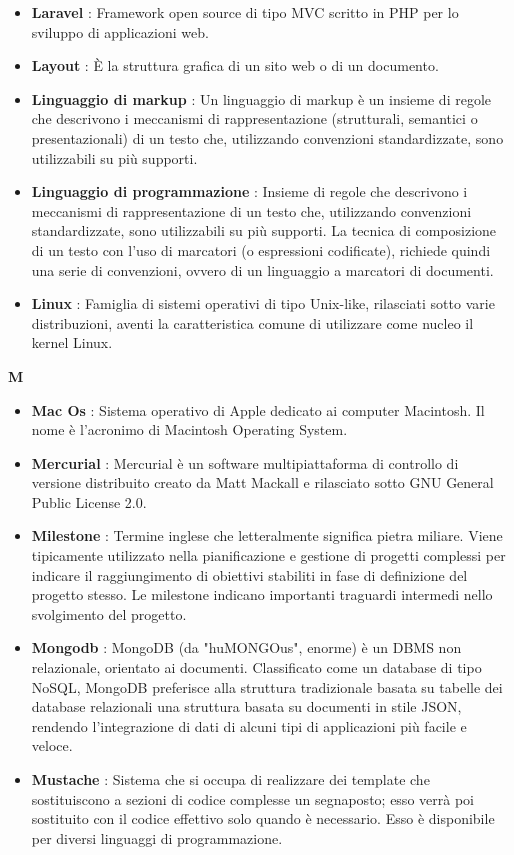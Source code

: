 \begin{flushleft}
\begin{itemize}[label={}]
\item \textbf{Laravel} : Framework open source di tipo MVC scritto in PHP per lo sviluppo di applicazioni web.
\item \textbf{Layout} : È la struttura grafica di un sito web o di un documento.
\item \textbf{Linguaggio di markup} : Un linguaggio di markup è un insieme di regole che descrivono i meccanismi di rappresentazione (strutturali, semantici o presentazionali) di un testo che, utilizzando convenzioni standardizzate, sono utilizzabili su più supporti.
\item \textbf{Linguaggio di programmazione} : Insieme di regole che descrivono i meccanismi di rappresentazione di un testo che, utilizzando convenzioni standardizzate, sono utilizzabili su più supporti. La tecnica di composizione di un testo con l'uso di marcatori (o espressioni codificate), richiede quindi una serie di convenzioni, ovvero di un linguaggio a marcatori di documenti.
\item \textbf{Linux} : Famiglia di sistemi operativi di tipo Unix-like, rilasciati sotto varie distribuzioni, aventi la caratteristica comune di utilizzare come nucleo il kernel Linux.
\end{itemize}
\end{flushleft}
\newpage
{\huge \textbf{M}}
\begin{flushleft}
\begin{itemize}[label={}]
\item \textbf{Mac Os} : Sistema operativo di Apple dedicato ai computer Macintosh. Il nome è l'acronimo di Macintosh Operating System.
\item \textbf{Mercurial} : Mercurial è un software multipiattaforma di controllo di versione distribuito creato da Matt Mackall e rilasciato sotto GNU General Public License 2.0.
\item \textbf{Milestone} : Termine inglese che letteralmente significa pietra miliare. Viene tipicamente utilizzato nella pianificazione e gestione di progetti complessi per indicare il raggiungimento di obiettivi stabiliti in fase di definizione del progetto stesso. Le milestone indicano importanti traguardi intermedi nello svolgimento del progetto.
\item \textbf{Mongodb} : MongoDB (da "huMONGOus", enorme) è un DBMS non relazionale, orientato ai documenti. Classificato come un database di tipo NoSQL, MongoDB preferisce alla struttura tradizionale basata su tabelle dei database relazionali una struttura basata su documenti in stile JSON, rendendo l'integrazione di dati di alcuni tipi di applicazioni più facile e veloce.
\item \textbf{Mustache} : Sistema che si occupa di realizzare dei template che sostituiscono a sezioni di codice complesse un segnaposto; esso verrà poi sostituito con il codice effettivo solo quando è necessario. Esso è disponibile per diversi linguaggi di programmazione.
\end{itemize}
\end{flushleft}
